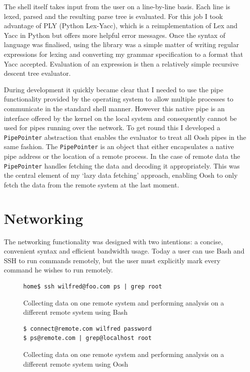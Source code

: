 \documentclass[12pt,twoside,notitlepage]{report}
\begin{document}
The shell itself takes input from the user on a line-by-line
basis. Each line is lexed, parsed and the resulting parse tree is
evaluated. For this job I took advantage of PLY (Python Lex-Yacc),
which is a reimplementation of Lex and Yacc in Python but offers more
helpful error messages. Once the syntax of language was finalised,
using the library was a simple matter of writing regular expressions
for lexing and converting my grammar specification to a format that
Yacc accepted. Evaluation of an expression is then a relatively simple
recursive descent tree evaluator.

During development it quickly became clear that I needed to use the
pipe functionality provided by the operating system to allow multiple
processes to communicate in the standard shell manner. However this
native pipe is an interface offered by the kernel on the local system
and consequently cannot be used for pipes running over the network. To
get round this I developed a {\tt PipePointer} abstraction that
enables the evaluator to treat all Oosh pipes in the same fashion. The
{\tt PipePointer} is an object that either encapsulates a native pipe
address or the location of a remote process. In the case of remote
data the {\tt PipePointer} handles fetching the data and decoding it
appropriately. This was the central element of my `lazy data fetching'
approach, enabling Oosh to only fetch the data from the remote system
at the last moment.

\section{Networking}
\label{networking}

The networking functionality was designed with two intentions: a concise,
convenient syntax and efficient bandwidth usage. Today a user can use Bash and
SSH to run commands remotely, but the user must explicitly mark every
command he wishes to run remotely.

\begin{figure}[h]
\begin{Verbatim}[frame=single,framerule=0.2pt,framesep=5pt]
home$ ssh wilfred@foo.com ps | grep root
\end{Verbatim}
\caption{Collecting data on one remote system and performing analysis
  on a different remote system using Bash}
\label{sshremote}
\end{figure}

\begin{figure}[h]
\begin{Verbatim}[frame=single,framerule=0.2pt,framesep=5pt]
$ connect@remote.com wilfred password
$ ps@remote.com | grep@localhost root
\end{Verbatim}
\caption{Collecting data on one remote system and performing analysis
  on a different remote system using Oosh}
\end{figure}
\end{document}
